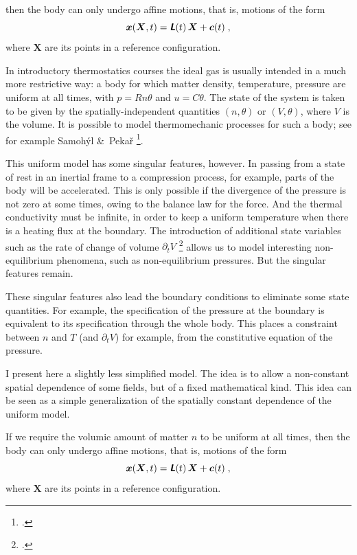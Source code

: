 \documentclass[\ifafour a4paper,12pt,\else a5paper,10pt,\fi%
onecolumn,oneside,article,%
british%
]{memoir}
\theoremstyle{remark}
\theoremstyle{innote}
\newcommand*{\mathte}[1]{\textbf{\textit{\textsf{#1}}}}
\newcommand*{\citep}{\footcites}
\newcommand*{\amp}{\&}
\newcommand*{\de}{\partialup}%
\renewcommand*{\|}[1][]{\nonscript\,#1\vert\nonscript\;\mathopen{}}
\newcommand*{\yt}{\theta}
\newcommand*{\yx}{\bm{x}}
\newcommand*{\yX}{\bm{X}}
\newcommand*{\yD}{\mathte{L}}
\newcommand*{\yc}{\bm{c}}
\begin{document}
then the body can only undergo affine motions, that is, motions of the form
\begin{equation}
  \label{eq:affine_motion}
  \yx(\yX,t) = \yD(t)\,\yX + \yc(t) \;,
\end{equation}
where $\yX$ are its points in a reference configuration.



In introductory thermostatics courses the ideal gas is usually intended in
a much more restrictive way: a body for which matter density, temperature,
pressure are uniform at all times, with $p = R n \yt$ and $u = C \yt$. The
state of the system is taken to be given by the spatially-independent quantities
$(n,\yt)$ or $(V,\yt)$, where $V$ is the volume. It is possible to model
thermomechanic processes for such a body; see for example Samoh\'yl \amp\
Peka\v{r} \citep{samohyletal1987_r2014}.

This uniform model has some singular features, however. In passing from a
state of rest in an inertial frame to a compression process, for example,
parts of the body will be accelerated. This is only possible if the
divergence of the pressure is not zero at some times, owing to the balance
law for the force. And the thermal conductivity must be infinite, in order
to keep a uniform temperature when there is a heating flux at the boundary.
The introduction of additional state variables such as the rate of change
of volume $\de_{t}V$ \citep{samohyletal1987_r2014} allows us to model
interesting non-equilibrium phenomena, such as non-equilibrium pressures.
But the singular features remain.

These singular features also lead the boundary conditions to eliminate some
state quantities. For example, the specification of the pressure at the
boundary is equivalent to its specification through the whole body. This
places a constraint between $n$ and $T$ (and $\de_{t}V$) for example, from
the constitutive equation of the pressure.

\bigskip

I present here a slightly less simplified model. The idea is to allow a
non-constant spatial dependence of some fields, but of a fixed mathematical
kind. This idea can be seen as a simple generalization of the spatially
constant dependence of the uniform model.

If we require the volumic amount of matter $n$ to be uniform at all times,
then the body can only undergo affine motions, that is, motions of the form
\begin{equation}
  \label{eq:affine_motion}
  \yx(\yX,t) = \yD(t)\,\yX + \yc(t) \;,
\end{equation}
where $\yX$ are its points in a reference configuration.
\end{document}
